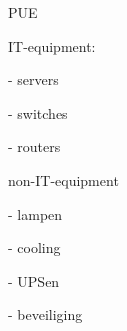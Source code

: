 PUE

IT-equipment:

- servers

- switches

- routers

non-IT-equipment

- lampen

- cooling

- UPSen

- beveiliging
